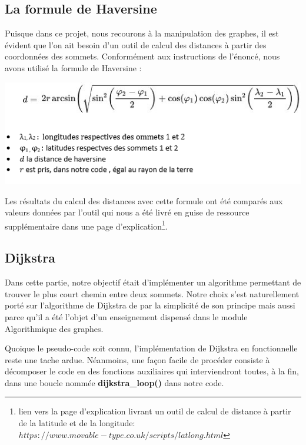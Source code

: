 \documentclass[french]{article}
\begin{document}
\subsection{La formule de Haversine} %
Puisque dans ce projet, nous recourons à la manipulation des graphes, il est évident que l'on ait besoin d'un outil de calcul des distances à partir des coordonnées des sommets. Conformément aux instructions de l'énoncé, nous avons utilisé la formule de Haversine :
\newline
\begin{center}
\includegraphics[scale=0.9]{hav.png}
\end{center}

Les résultats du calcul des distances avec cette formule ont été comparés aux valeurs données par l'outil qui nous a été livré en guise de ressource supplémentaire dans une page d'explication\footnote{lien vers la page d'explication livrant un outil de calcul de distance à partir de la latitude et de la longitude: $https://www.movable-type.co.uk/scripts/latlong.html$}. 

\subsection{Dijkstra}%

Dans cette partie, notre objectif était d'implémenter un algorithme permettant de trouver le plus court chemin entre deux sommets. Notre choix s'est naturellement porté sur l'algorithme de Dijkstra de par la simplicité de son principe mais aussi parce qu'il a été l'objet d'un enseignement dispensé dans le module Algorithmique des graphes.\newline 

Quoique le pseudo-code soit connu, l'implémentation de Dijkstra en fonctionnelle reste une tache ardue. Néanmoins, une façon facile de procéder consiste à décomposer le code en des fonctions auxiliaires qui interviendront toutes, à la fin, dans une boucle nommée \textbf{dijkstra\_loop()} dans notre code.\newline  
\end{document}
